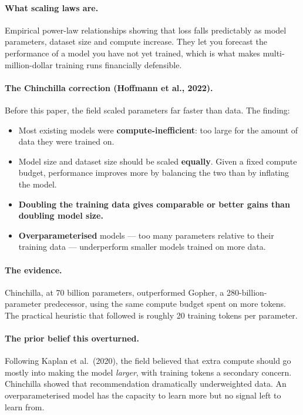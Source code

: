 \documentclass[11pt,a4paper]{article}
\begin{document}
\paragraph{What scaling laws are.} Empirical power-law relationships showing that loss falls
predictably as model parameters, dataset size and compute increase. They let you forecast the
performance of a model you have not yet trained, which is what makes multi-million-dollar
training runs financially defensible.

\paragraph{The Chinchilla correction (Hoffmann et al., 2022).} Before this paper, the field
scaled parameters far faster than data. The finding:
\begin{itemize}
\item Most existing models were \textbf{compute-inefficient}: too large for the amount of
  data they were trained on.
\item Model size and dataset size should be scaled \textbf{equally}. Given a fixed compute
  budget, performance improves more by balancing the two than by inflating the model.
\item \textbf{Doubling the training data gives comparable or better gains than doubling model
  size.}
\item \textbf{Overparameterised} models --- too many parameters relative to their training
  data --- underperform smaller models trained on more data.
\end{itemize}

\paragraph{The evidence.} Chinchilla, at 70 billion parameters, outperformed Gopher, a
280-billion-parameter predecessor, using the same compute budget spent on more tokens. The
practical heuristic that followed is roughly 20 training tokens per parameter.

\paragraph{The prior belief this overturned.} Following Kaplan et al.\ (2020), the field
believed that extra compute should go mostly into making the model \emph{larger}, with
training tokens a secondary concern. Chinchilla showed that recommendation dramatically
underweighted data. An overparameterised model has the capacity to learn more but no signal
left to learn from.
\end{document}
